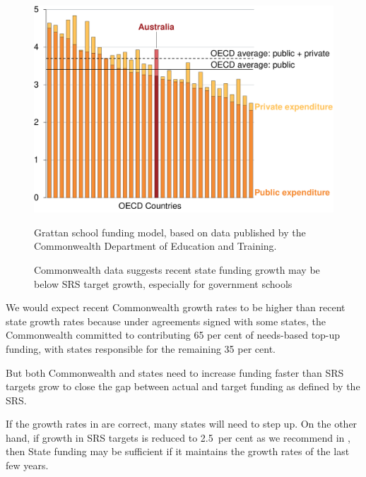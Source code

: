 \documentclass{grattan}
\begin{document}
\begin{figure}
\caption{Commonwealth data suggests recent state funding growth may be below SRS target growth, especially for government schools}\label{fig:State-govt-funding-growth-below-SRS-target-growth}

\includegraphics[page=23]{atlas/Charts.pdf}

%
{Grattan school funding model, based on data published by the Commonwealth Department of Education and Training.}
\end{figure}

We would expect recent Commonwealth growth rates to be higher than recent state growth rates because under agreements signed with some states, the Commonwealth committed to contributing 65 per cent of needs-based top-up funding, with states responsible for the remaining 35 per cent.

But both Commonwealth and states need to increase funding faster than SRS targets grow to close the gap between actual and target funding as defined by the SRS\@.

If the growth rates in  are correct, many states will need to step up.
On the other hand, if growth in SRS targets is reduced to 2.5~per cent as we recommend in , then State funding may be sufficient if it maintains the growth rates of the last few years.
\printbibliography
\end{document}
